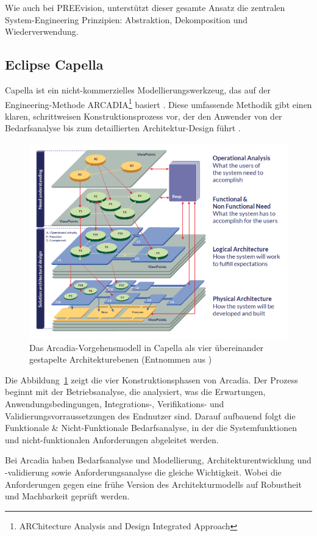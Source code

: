 Wie auch bei PREEvision, unterstützt dieser gesamte Ansatz die zentralen System-Engineering Prinzipien: Abstraktion, Dekomposition und Wiederverwendung\cite{themathworksinc.2025system}.

\subsection{Eclipse Capella}
Capella ist ein nicht-kommerzielles Modellierungswerkzeug, das auf der Engineering-Methode ARCADIA\footnote{ARChitecture Analysis and Design Integrated Approach} basiert \cite{roques2016mbse}. Diese umfassende Methodik gibt einen klaren, schrittweisen Konstruktionsprozess vor, der den Anwender von der Bedarfsanalyse bis zum detaillierten Architektur-Design führt \cite{let}.

\begin{figure}
  \centering
  \includegraphics[width=.7\textwidth]{figures/03StandDerTechnik/phases_arcadia.png}
  \caption{Das Arcadia-Vorgehensmodell in Capella als vier übereinander gestapelte Architekturebenen (Entnommen aus \cite{let})}
  \label{fig:capella_modell}
\end{figure}

Die Abbildung~\ref{fig:capella_modell} zeigt die vier Konstruktionsphasen von Arcadia. Der Prozess beginnt mit der Betriebsanalyse, die analysiert, was die Erwartungen, Anwendungsbedingungen, Integrations-, Verifikations- und Validierungsvorraussetzungen des Endnutzer sind. Darauf aufbauend folgt die Funktionale \& Nicht-Funktionale Bedarfsanalyse, in der die Systemfunktionen und nicht-funktionalen Anforderungen abgeleitet werden.

Bei Arcadia haben Bedarfsanalyse und Modellierung, Architekturentwicklung und -validierung sowie Anforderungsanalyse die gleiche Wichtigkeit. Wobei die Anforderungen gegen eine frühe Version des Architekturmodells auf Robustheit und Machbarkeit geprüft werden.


